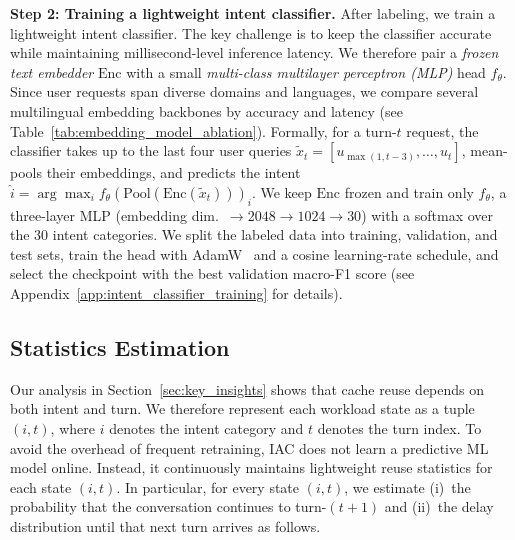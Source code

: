 \documentclass{article}
\newcommand{\hasan}[1]{\textcolor{blue}{[Hasan: #1]}}
\newcommand{\bo}[1]{\textcolor{red}{[Bo: #1]}}
\begin{document}
\textbf{Step 2: Training a lightweight intent classifier.} After labeling, we train a lightweight intent classifier. The key challenge is to keep the classifier accurate while maintaining millisecond-level inference latency. We therefore pair a \emph{frozen text embedder} \(\mathrm{Enc}\) with a small \emph{multi-class multilayer perceptron (MLP)} head \(f_{\theta}\). Since user requests span diverse domains and languages, we compare several multilingual embedding backbones by accuracy and latency (see Table~\ref{tab:embedding_model_ablation}). Formally, for a turn-\(t\) request, the classifier takes up to the last four user queries \(\tilde{x}_t=[u_{\max(1,t-3)},\ldots,u_t]\), mean-pools their embeddings, and predicts the intent \(\hat{i}=\arg\max_i f_{\theta}(\mathrm{Pool}(\mathrm{Enc}(\tilde{x}_t)))_i\). We keep \(\mathrm{Enc}\) frozen and train only \(f_{\theta}\), a three-layer MLP (embedding dim.\ \(\!\rightarrow\! 2048 \!\rightarrow\! 1024 \!\rightarrow\! 30\)) with a softmax over the 30 intent categories.
We split the labeled data into training, validation, and test sets, train the head with AdamW~\cite{adamw} and a cosine learning-rate schedule, and select the checkpoint with the best validation macro-F1 score (see Appendix~\ref{app:intent_classifier_training} for details).



\vspace{-5pt}

\subsection{Statistics Estimation}
\label{sec:online_learning}
\vspace{-5pt}

Our analysis in Section~\ref{sec:key_insights} shows that cache reuse depends on both intent and turn. We therefore represent each workload state as a tuple \((i,t)\), where \(i\) denotes the intent category and \(t\) denotes the turn index. To avoid the overhead of frequent retraining, IAC does not learn a predictive ML model online. Instead, it continuously maintains lightweight reuse statistics for each state \((i,t)\). In particular, for every state \((i,t)\), we estimate (i)~the probability that the conversation continues to turn-\((t+1)\)
and (ii)~the delay distribution until that next turn arrives as follows.
\end{document}
